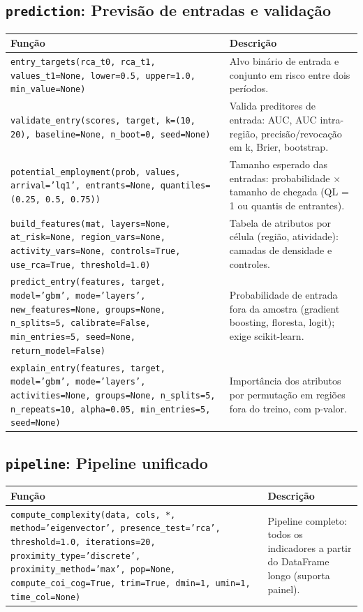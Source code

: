 \subsection{\texttt{prediction}: Previs\~{a}o de entradas e valida\c{c}\~{a}o}
\begin{longtable}{>{\raggedright\arraybackslash}p{9.2cm} >{\raggedright\arraybackslash}p{7.0cm}}
\toprule
\textbf{Fun\c{c}\~{a}o} & \textbf{Descri\c{c}\~{a}o} \\
\midrule\endhead
\texttt{\footnotesize entry\_targets(rca\_t0, rca\_t1, values\_t1=None, lower=0.5, upper=1.0, min\_value=None)} & {\small Alvo bin\'{a}rio de entrada e conjunto em risco entre dois per\'{i}odos.} \\[2pt]
\texttt{\footnotesize validate\_entry(scores, target, k=(10, 20), baseline=None, n\_boot=0, seed=None)} & {\small Valida preditores de entrada: AUC, AUC intra-regi\~{a}o, precis\~{a}o/revoca\c{c}\~{a}o em k, Brier, bootstrap.} \\[2pt]
\texttt{\footnotesize potential\_employment(prob, values, arrival='lq1', entrants=None, quantiles=(0.25, 0.5, 0.75))} & {\small Tamanho esperado das entradas: probabilidade $\times$ tamanho de chegada (QL = 1 ou quantis de entrantes).} \\[2pt]
\texttt{\footnotesize build\_features(mat, layers=None, at\_risk=None, region\_vars=None, activity\_vars=None, controls=True, use\_rca=True, threshold=1.0)} & {\small Tabela de atributos por c\'{e}lula (regi\~{a}o, atividade): camadas de densidade e controles.} \\[2pt]
\texttt{\footnotesize predict\_entry(features, target, model='gbm', mode='layers', new\_features=None, groups=None, n\_splits=5, calibrate=False, min\_entries=5, seed=None, return\_model=False)} & {\small Probabilidade de entrada fora da amostra (gradient boosting, floresta, logit); exige scikit-learn.} \\[2pt]
\texttt{\footnotesize explain\_entry(features, target, model='gbm', mode='layers', activities=None, groups=None, n\_splits=5, n\_repeats=10, alpha=0.05, min\_entries=5, seed=None)} & {\small Import\^{a}ncia dos atributos por permuta\c{c}\~{a}o em regi\~{o}es fora do treino, com p-valor.} \\[2pt]
\bottomrule
\end{longtable}

\subsection{\texttt{pipeline}: Pipeline unificado}
\begin{longtable}{>{\raggedright\arraybackslash}p{9.2cm} >{\raggedright\arraybackslash}p{7.0cm}}
\toprule
\textbf{Fun\c{c}\~{a}o} & \textbf{Descri\c{c}\~{a}o} \\
\midrule\endhead
\texttt{\footnotesize compute\_complexity(data, cols, *, method='eigenvector', presence\_test='rca', threshold=1.0, iterations=20, proximity\_type='discrete', proximity\_method='max', pop=None, compute\_coi\_cog=True, trim=True, dmin=1, umin=1, time\_col=None)} & {\small Pipeline completo: todos os indicadores a partir do DataFrame longo (suporta painel).} \\[2pt]
\bottomrule
\end{longtable}
